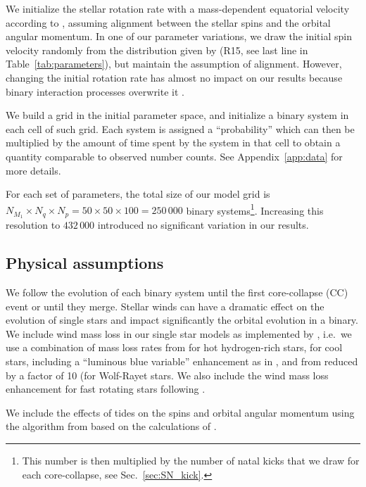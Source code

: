 \documentclass{aa}
\DeclareRobustCommand{\Tabref}[1]{Table~\ref{#1}}
\DeclareRobustCommand{\Secref}[1]{Sec.~\ref{#1}}
\begin{document}
We initialize the stellar rotation rate with a mass-dependent
equatorial velocity according to \cite{hurley:00}, assuming
alignment between the stellar spins and the orbital angular momentum. In one of our
parameter variations, we draw the initial spin velocity randomly from
the distribution given by \citealt{ramirez-agudelo:15} (R15, see last
line in \Tabref{tab:parameters}), but maintain the assumption of
alignment. However, changing the initial rotation rate has almost no
impact on our results because binary interaction processes overwrite it \citep[][]{demink:13}.  

We build a grid in the initial parameter space, and initialize a
binary system in each cell of such grid. 
Each system is assigned a ``probability''
which can then be multiplied by the
amount of time spent by the system in that cell to obtain a quantity comparable to
observed number counts. See Appendix~\ref{app:data} for more details.

For each set of parameters, the total size of our model grid is
$N_{M_1}\times N_q \times N_p = 50 \times 50 \times 100 = 250\,000$ 
binary systems\footnote{This number is then multiplied by the number
  of natal kicks that we draw for each core-collapse, see \Secref{sec:SN_kick}.}.  Increasing this resolution to
$432\,000$ introduced no
significant variation in our results.

\subsection{Physical assumptions}

We follow the evolution of each binary system until the
first core-collapse (CC) event or until they merge. 
Stellar winds can have a dramatic effect on the evolution of single
stars \citep[e.g.,][]{renzo:17} and impact significantly the orbital
evolution in a binary. We include wind mass loss in our single star models as implemented by
\cite{demink:13}, i.e.\ we use a combination of mass loss rates from
\cite{vink:00,vink:01} for hot hydrogen-rich stars,
\cite{nieuwenhuijzen:90} for cool stars, %
 including a ``luminous blue variable'' enhancement as in
 \citealt{hurley:00}, and from \cite{hamann:98} reduced by a factor of 10 (for
 Wolf-Rayet stars. We also include the wind mass loss
 enhancement for fast rotating stars following \cite{maeder:00}.
 
We include the effects
of tides on the spins and orbital angular momentum using the
algorithm from \cite{hurley:02} based on the calculations of \cite{zahn:77,hut:81}. 
\end{document}
